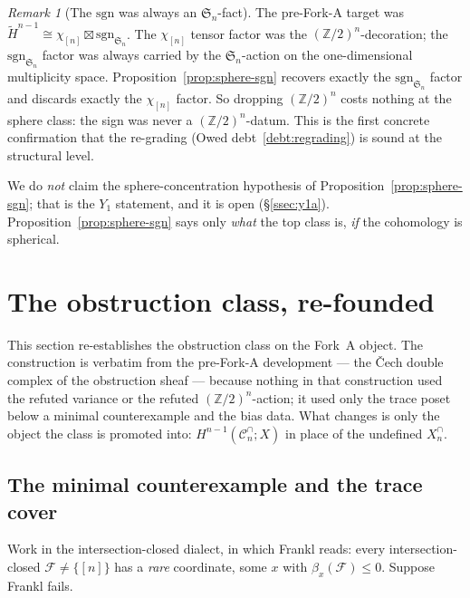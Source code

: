 \documentclass[11pt,oneside]{amsart}
\theoremstyle{plain}
\theoremstyle{definition}
\theoremstyle{remark}
\newtheorem{remark}[theorem]{Remark}
\theoremstyle{honeststyle}
\newcommand{\F}{\mathcal{F}}
\newcommand{\bias}{\beta}
\newcommand{\sgn}{\mathrm{sgn}}
\newcommand{\Sym}{\mathfrak{S}}
\newcommand{\Z}{\mathbb{Z}}
\newcommand{\Cn}{\mathcal{C}^{\cap}_n}
\newcommand{\walsh}[1]{\chi_{#1}}
\begin{document}
\begin{remark}[The $\sgn$ was always an $\Sym_n$-fact]
\label{rem:sgn-always-sn}
The pre-Fork-A target was $\widetilde H^{n-1}\cong\walsh{[n]}\boxtimes
\sgn_{\Sym_n}$. The $\walsh{[n]}$ tensor factor was the
$(\Z/2)^n$-decoration; the $\sgn_{\Sym_n}$ factor was always carried by
the $\Sym_n$-action on the one-dimensional multiplicity space.
Proposition~\ref{prop:sphere-sgn} recovers exactly the $\sgn_{\Sym_n}$
factor and discards exactly the $\walsh{[n]}$ factor. So dropping
$(\Z/2)^n$ costs nothing at the sphere class: the sign was never a
$(\Z/2)^n$-datum. This is the first concrete confirmation that the
re-grading (Owed debt~\ref{debt:regrading}) is sound at the structural
level.
\end{remark}

We do \emph{not} claim the sphere-concentration hypothesis of
Proposition~\ref{prop:sphere-sgn}; that is the $Y_1$ statement, and it
is open (\S\ref{ssec:y1a}). Proposition~\ref{prop:sphere-sgn} says only
\emph{what} the top class is, \emph{if} the cohomology is spherical.

\section{The obstruction class, re-founded}
\label{sec:obstruction}

This section re-establishes the obstruction class on the Fork~A object.
The construction is verbatim from the pre-Fork-A development --- the
\v{C}ech double complex of the obstruction sheaf --- because nothing in
that construction used the refuted variance or the refuted
$(\Z/2)^n$-action; it used only the trace poset below a minimal
counterexample and the bias data. What changes is only the object the
class is promoted into: $H^{n-1}(\Cn;X)$ in place of the undefined
$X^{\cap}_n$.

\subsection{The minimal counterexample and the trace cover}
\label{ssec:trace-cover}

Work in the intersection-closed dialect, in which Frankl reads: every
intersection-closed $\F\neq\{[n]\}$ has a \emph{rare} coordinate, some
$x$ with $\bias_x(\F)\le0$. Suppose Frankl fails.
\end{document}
